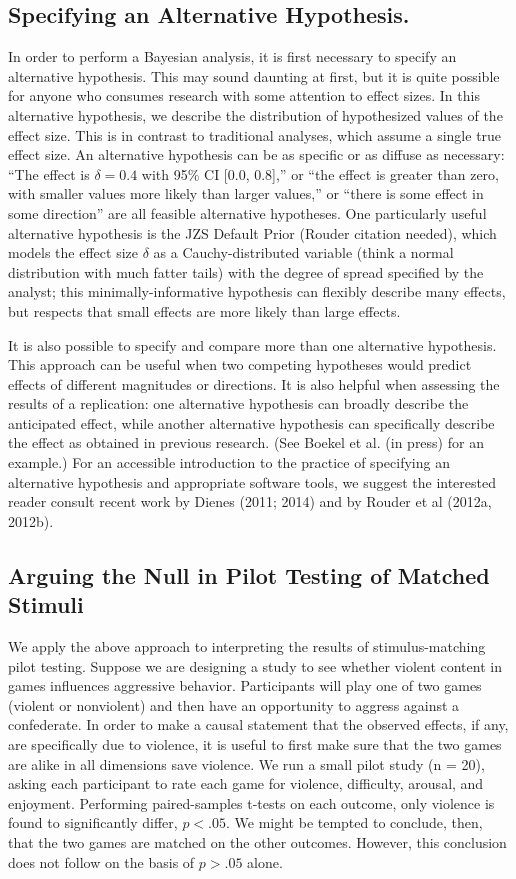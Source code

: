 \documentclass[fignum,nobf,man]{apa}
\begin{document}
\subsection{Specifying an Alternative Hypothesis.  }
In order to perform a Bayesian analysis, it is first necessary to specify an alternative hypothesis. This may sound daunting at first, but it is quite possible for anyone who consumes research with some attention to effect sizes. In this alternative hypothesis, we describe the distribution of hypothesized values of the effect size. This is in contrast to traditional analyses, which assume a single true effect size. An alternative hypothesis can be as specific or as diffuse as necessary: ``The effect is $\delta = 0.4$ with 95\% CI [0.0, 0.8],'' or ``the effect is greater than zero, with smaller values more likely than larger values,'' or ``there is some effect in some direction'' are all feasible alternative hypotheses. One particularly useful alternative hypothesis is the JZS Default Prior (Rouder citation needed), which models the effect size $\delta$ as a Cauchy-distributed variable (think a normal distribution with much fatter tails) with the degree of spread specified by the analyst; this minimally-informative hypothesis can flexibly describe many effects, but respects that small effects are more likely than large effects.

It is also possible to specify and compare more than one alternative hypothesis. This approach can be useful when two competing hypotheses would predict effects of different magnitudes or directions. It is also helpful when assessing the results of a replication: one alternative hypothesis can broadly describe the anticipated effect, while another alternative hypothesis can specifically describe the effect as obtained in previous research. (See Boekel et al. (in press) for an example.)  For an accessible introduction to the practice of specifying an alternative hypothesis and appropriate software tools, we suggest the interested reader consult recent work by Dienes (2011; 2014) and by Rouder et al (2012a, 2012b).

\subsection{Arguing the Null in Pilot Testing of Matched Stimuli}
We apply the above approach to interpreting the results of stimulus-matching pilot testing.  Suppose we are designing a study to see whether violent content in games influences aggressive behavior. Participants will play one of two games (violent or nonviolent) and then have an opportunity to aggress against a confederate. In order to make a causal statement that the observed effects, if any, are specifically due to violence, it is useful to first make sure that the two games are alike in all dimensions save violence. We run a small pilot study (n = 20), asking each participant to rate each game for violence, difficulty, arousal, and enjoyment. Performing paired-samples t-tests on each outcome, only violence is found to significantly differ, $p < .05$. We might be tempted to conclude, then, that the two games are matched on the other outcomes. However, this conclusion does not follow on the basis of $p > .05$ alone.
\end{document}
